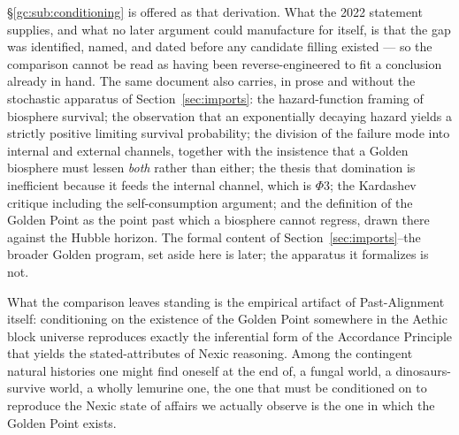 \S\ref{gc:sub:conditioning} is offered as that derivation. What the 2022
statement supplies, and what no later argument could manufacture for
itself, is that the gap was identified, named, and dated before any
candidate filling existed --- so the comparison cannot be read as having
been reverse-engineered to fit a conclusion already in hand. The same
document also carries, in prose and without the stochastic apparatus of
Section~\ref{sec:imports}: the hazard-function framing of biosphere survival; the
observation that an exponentially decaying hazard yields a strictly
positive limiting survival probability; the division of the failure mode
into internal and external channels, together with the insistence that a
Golden biosphere must lessen \emph{both} rather than either; the thesis
that domination is inefficient because it feeds the internal channel,
which is $\Phi3$; the Kardashev critique including the
self-consumption argument; and the definition of the Golden Point as the
point past which a biosphere cannot regress, drawn there against the
Hubble horizon. The formal content of
Section~\ref{sec:imports}--the broader Golden program, set aside here is later; the apparatus it formalizes is
not.

\begin{corollary}\label{gc:cor:remains}
What the comparison leaves standing is the empirical artifact of
Past-Alignment itself: conditioning on the existence of the Golden Point
somewhere in the Aethic block universe reproduces exactly the
inferential form of the Accordance Principle that yields the
stated-attributes of Nexic reasoning. Among the contingent natural
histories one might find oneself at the end of, a fungal world, a
dinosaurs-survive world, a wholly lemurine one, the one that must be
conditioned on to reproduce the Nexic state of affairs we actually
observe is the one in which the Golden Point exists.
\end{corollary}

